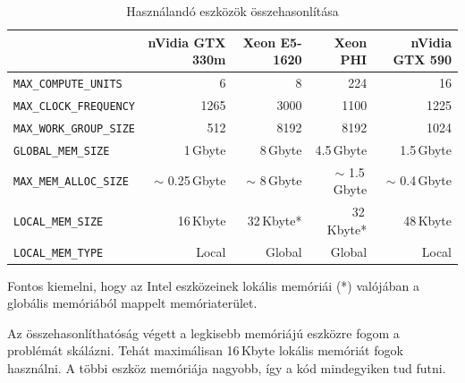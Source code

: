 	\begin{table}[!h]
	\setlength{\extrarowheight}{8pt}
	\centering
	\footnotesize
	\begin{tabular}{ l | r | r | r | r}
		 & nVidia GTX 330m & Xeon E5-1620 & Xeon PHI & nVidia GTX 590\\ \hline
		\texttt{MAX\_COMPUTE\_UNITS} & 6 & 8 & 224 & 16\\
		\texttt{MAX\_CLOCK\_FREQUENCY} & 1265 & 3000 & 1100 & 1225\\
		\texttt{MAX\_WORK\_GROUP\_SIZE} & 512 & 8192 & 8192 & 1024\\ \hline\hline
		\texttt{GLOBAL\_MEM\_SIZE} & 1\,Gbyte & 8\,Gbyte & 4.5\,Gbyte & 1.5\,Gbyte\\
		\texttt{MAX\_MEM\_ALLOC\_SIZE} & $\sim$ 0.25\,Gbyte & $\sim$ 8\,Gbyte & $\sim$ 1.5\,Gbyte & $\sim$ 0.4\,Gbyte\\
		\texttt{LOCAL\_MEM\_SIZE} & 16\,Kbyte & 32\,Kbyte* & 32\,Kbyte* & 48\,Kbyte\\
		\texttt{LOCAL\_MEM\_TYPE} & Local & Global & Global & Local\\
	\end{tabular}
	
	\caption{Használandó eszközök összehasonlítása}
	\label{table:envs}
	\end{table}
	
	Fontos kiemelni, hogy az Intel eszközeinek lokális memóriái (*) valójában a globális memóriából mappelt memóriaterület.
	
	Az összehasonlíthatóság végett a legkisebb memóriájú eszközre fogom a problémát skálázni. Tehát maximálisan 16\,Kbyte lokális
	memóriát fogok használni. A többi eszköz memóriája nagyobb, így a kód mindegyiken tud futni.
	
